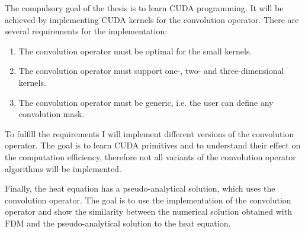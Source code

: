 The compulsory goal of the thesis is to learn CUDA programming.
It will be achieved by implementing CUDA kernels for the convolution operator.
There are several requirements for the implementation:

\begin{enumerate}
 \item The convolution operator must be optimal for the small kernels.
 \item The convolution operator must support one-, two- and three-dimensional kernels.
 \item The convolution operator must be generic, i.e. the user can define any convolution mask.
\end{enumerate}

To fulfill the requirements I will implement different versions of the convolution operator.
The goal is to learn CUDA primitives and to understand their effect on the computation efficiency, therefore not all variants of the convolution operator algorithms will be implemented.

Finally, the heat equation has a pseudo-analytical solution, which uses the convolution operator.
The goal is to use the implementation of the convolution operator and show the similarity between the numerical solution obtained with FDM and the pseudo-analytical solution to the heat equation.

